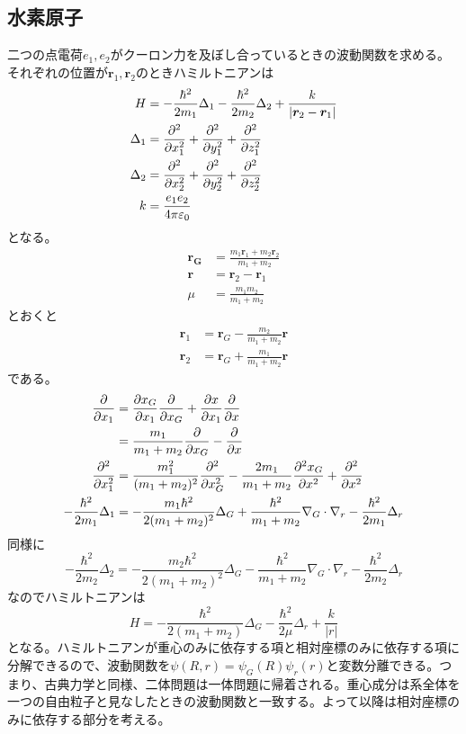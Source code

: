 \subsection{水素原子}
    二つの点電荷$e_1, e_2$がクーロン力を及ぼし合っているときの波動関数を求める。それぞれの位置が$\bm{r}_1, \bm{r}_2$のときハミルトニアンは
    \begin{align*}
        H &= -\frac{\hbar^2}{2m_1}\Delta_1 - \frac{\hbar^2}{2m_2}\Delta_2 + \frac{k}{|\bm{r}_2 - \bm{r}_1|}\\
        \Delta_1 &= \pdv[2]{x_1} + \pdv[2]{y_1} + \pdv[2]{z_1}\\
        \Delta_2 &= \pdv[2]{x_2} + \pdv[2]{y_2} + \pdv[2]{z_2}\\
        k &= \frac{e_1e_2}{4\pi\varepsilon_0}
    \end{align*}
    となる。
    \begin{align*}
        \bm{r_G} &= \frac{m_1\bm{r}_1 + m_2\bm{r}_2}{m_1 + m_2}\\
        \bm{r} &= \bm{r}_2 - \bm{r}_1\\
        \mu &= \frac{m_1m_2}{m_1 + m_2}
    \end{align*}
    とおくと
    \begin{align*}
        \bm{r}_1 &= \bm{r}_G - \frac{m_2}{m_1 + m_2}\bm{r}\\
        \bm{r}_2 &= \bm{r}_G + \frac{m_1}{m_1 + m_2}\bm{r}
    \end{align*}
    である。
    \begin{align*}
        \pdv{x_1}
        &= \pdv{x_G}{x_1}\pdv{x_G} + \pdv{x}{x_1}\pdv{x}\\
        &= \frac{m_1}{m_1 + m_2}\pdv{x_G} - \pdv{x}\\
        \pdv[2]{x_1}
        &= \frac{m_1^2}{(m_1 + m_2)^2}
        \pdv[2]{x_G} - \frac{2m_1}{m_1 + m_2} \pdv[2]{x_G}{x} + \pdv[2]{x}\\
        -\frac{\hbar^2}{2m_1}\Delta_1
        &= -\frac{m_1\hbar^2}{2(m_1 + m_2)^2}\Delta_G + \frac{\hbar^2}{m_1 + m_2}\nabla_G \cdot \nabla_r - \frac{\hbar^2}{2m_1}\Delta_r
    \end{align*}
    同様に
        \[-\frac{\hbar^2}{2m_2}\Delta_2 = -\frac{m_2\hbar^2}{2(m_1 + m_2)^2}\Delta_G - \frac{\hbar^2}{m_1 + m_2}\nabla_G \cdot \nabla_r - \frac{\hbar^2}{2m_2}\Delta_r\]
    なのでハミルトニアンは
        \[H = -\frac{\hbar^2}{2(m_1 + m_2)}\Delta_G - \frac{\hbar^2}{2\mu}\Delta_r + \frac{k}{|r|}\]
    となる。ハミルトニアンが重心のみに依存する項と相対座標のみに依存する項に分解できるので、波動関数を$\psi(R, r) = \psi_G(R)\psi_r(r)$と変数分離できる。つまり、古典力学と同様、二体問題は一体問題に帰着される。重心成分は系全体を一つの自由粒子と見なしたときの波動関数と一致する。よって以降は相対座標のみに依存する部分を考える。

